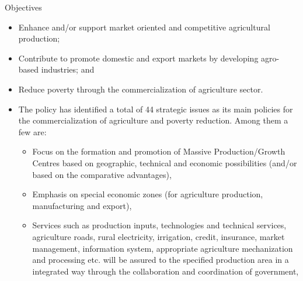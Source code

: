 \documentclass[12pt,ignorenonframetext,aspectratio=169]{beamer}
\providecommand{\tightlist}{%
  \setlength{\itemsep}{0pt}\setlength{\parskip}{0pt}}
\begin{document}
\begin{frame}{Objectives}
\protect\hypertarget{objectives}{}
\begin{itemize}
\tightlist
\item
  Enhance and/or support market oriented and competitive agricultural
  production;
\item
  Contribute to promote domestic and export markets by developing
  agro-based industries; and
\item
  Reduce poverty through the commercialization of agriculture sector.
\end{itemize}
\end{frame}

\begin{frame}{}
\protect\hypertarget{section-2}{}
\begin{itemize}
\tightlist
\item
  The policy has identified a total of 44 strategic issues as its main
  policies for the commercialization of agriculture and poverty
  reduction. Among them a few are:

  \begin{itemize}
  \tightlist
  \item
    Focus on the formation and promotion of Massive Production/Growth
    Centres based on geographic, technical and economic possibilities
    (and/or based on the comparative advantages),
  \item
    Emphasis on special economic zones (for agriculture production,
    manufacturing and export),
  \item
    Services such as production inputs, technologies and technical
    services, agriculture roads, rural electricity, irrigation, credit,
    insurance, market management, information system, appropriate
    agriculture mechanization and processing etc. will be assured to the
    specified production area in a integrated way through the
    collaboration and coordination of government,
  \end{itemize}
\end{itemize}
\end{frame}
\end{document}
